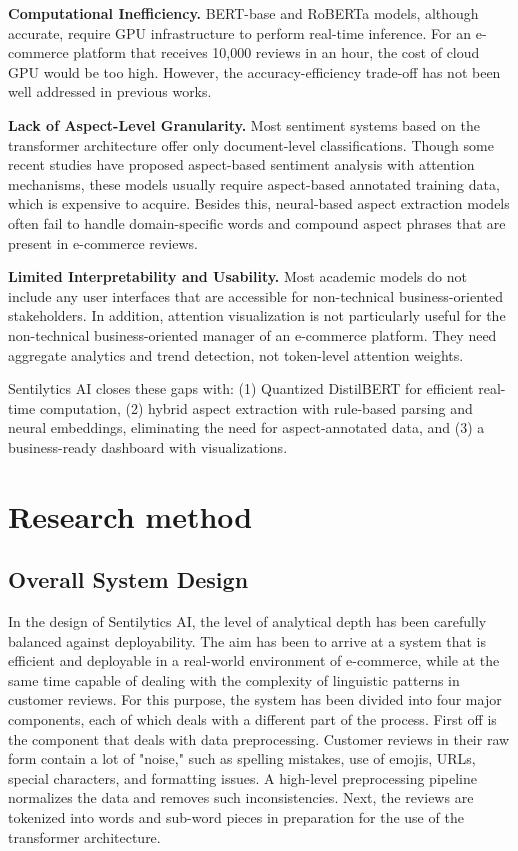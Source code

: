 \documentclass[11pt,a4paper]{article}
\begin{document}
\textbf{Computational Inefficiency.} BERT-base and RoBERTa models, although accurate, require GPU infrastructure to perform real-time inference. For an e-commerce platform that receives 10,000 reviews in an hour, the cost of cloud GPU would be too high. However, the accuracy-efficiency trade-off has not been well addressed in previous works.

\textbf{Lack of Aspect-Level Granularity.} Most sentiment systems based on the transformer architecture offer only document-level classifications. Though some recent studies have proposed aspect-based sentiment analysis with attention mechanisms, these models usually require aspect-based annotated training data, which is expensive to acquire. Besides this, neural-based aspect extraction models often fail to handle domain-specific words and compound aspect phrases that are present in e-commerce reviews.

\textbf{Limited Interpretability and Usability.} Most academic models do not include any user interfaces that are accessible for non-technical business-oriented stakeholders. In addition, attention visualization is not particularly useful for the non-technical business-oriented manager of an e-commerce platform. They need aggregate analytics and trend detection, not token-level attention weights.

Sentilytics AI closes these gaps with: (1) Quantized DistilBERT for efficient real-time computation, (2) hybrid aspect extraction with rule-based parsing and neural embeddings, eliminating the need for aspect-annotated data, and (3) a business-ready dashboard with visualizations.

\section{Research method}

\subsection{Overall System Design}

In the design of Sentilytics AI, the level of analytical depth has been carefully balanced against deployability. The aim has been to arrive at a system that is efficient and deployable in a real-world environment of e-commerce, while at the same time capable of dealing with the complexity of linguistic patterns in customer reviews. For this purpose, the system has been divided into four major components, each of which deals with a different part of the process. First off is the component that deals with data preprocessing. Customer reviews in their raw form contain a lot of "noise," such as spelling mistakes, use of emojis, URLs, special characters, and formatting issues. A high-level preprocessing pipeline normalizes the data and removes such inconsistencies. Next, the reviews are tokenized into words and sub-word pieces in preparation for the use of the transformer architecture.
\end{document}
